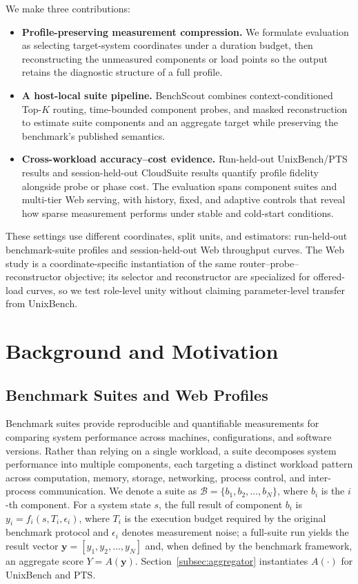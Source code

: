 \documentclass[sigconf, review, anonymous, balance=false]{acmart}
\begin{document}
We make three contributions:
\begin{itemize}
    \item \textbf{Profile-preserving measurement compression.} We formulate evaluation as selecting target-system coordinates under a duration budget, then reconstructing the unmeasured components or load points so the output retains the diagnostic structure of a full profile.
    \item \textbf{A host-local suite pipeline.} BenchScout combines context-conditioned Top-$K$ routing, time-bounded component probes, and masked reconstruction to estimate suite components and an aggregate target while preserving the benchmark's published semantics.
    \item \textbf{Cross-workload accuracy--cost evidence.} Run-held-out UnixBench/PTS results and session-held-out CloudSuite results quantify profile fidelity alongside probe or phase cost. The evaluation spans component suites and multi-tier Web serving, with history, fixed, and adaptive controls that reveal how sparse measurement performs under stable and cold-start conditions.
\end{itemize}
These settings use different coordinates, split units, and estimators: run-held-out benchmark-suite profiles and session-held-out Web throughput curves. The Web study is a coordinate-specific instantiation of the same router--probe--reconstructor objective; its selector and reconstructor are specialized for offered-load curves, so we test role-level unity without claiming parameter-level transfer from UnixBench.



\section{Background and Motivation}

\subsection{Benchmark Suites and Web Profiles}

Benchmark suites provide reproducible and quantifiable measurements for comparing system performance across machines, configurations, and software versions. Rather than relying on a single workload, a suite decomposes system performance into multiple components, each targeting a distinct workload pattern across computation, memory, storage, networking, process control, and inter-process communication.
We denote a suite as \(\mathcal{B}=\{b_1,b_2,\ldots,b_N\}\), where \(b_i\) is the \(i\)-th component.
For a system state \(s\), the full result of component \(b_i\) is \(y_i=f_i(s,T_i,\epsilon_i)\), where \(T_i\) is the execution budget required by the original benchmark protocol and \(\epsilon_i\) denotes measurement noise; a full-suite run yields the result vector \(\mathbf{y}=[y_1,y_2,\ldots,y_N]\) and, when defined by the benchmark framework, an aggregate score \(Y=A(\mathbf{y})\).
Section~\ref{subsec:aggregator} instantiates $A(\cdot)$ for UnixBench and PTS.
\end{document}
